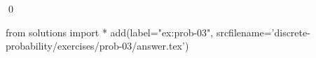 
\begin{ex} 
  \label{ex:prob-03}
  
  \qed
\end{ex} 
\begin{python0}
from solutions import *
add(label="ex:prob-03",
    srcfilename='discrete-probability/exercises/prob-03/answer.tex') 
\end{python0}
